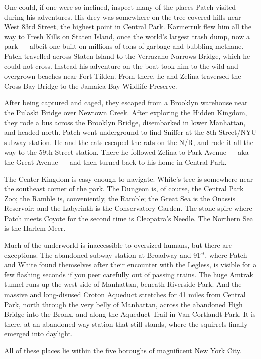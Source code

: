 \documentclass[12pt]{memoir}
\begin{document}
One could, if one were so inclined, inspect many of the places Patch
visited during his adventures. His drey was somewhere on the
tree-covered hills near West 83rd Street, the highest point in Central
Park. Karmerruk flew him all the way to Fresh Kills on Staten Island,
once the world’s largest trash dump, now a park — albeit one built on
millions of tons of garbage and bubbling methane. Patch travelled
across Staten Island to the Verrazano Narrows Bridge, which he could
not cross. Instead his adventure on the boat took him to the wild and
overgrown beaches near Fort Tilden. From there, he and Zelina
traversed the Cross Bay Bridge to the Jamaica Bay Wildlife Preserve.

After being captured and caged, they escaped from a Brooklyn warehouse
near the Pulaski Bridge over Newtown Creek. After exploring the Hidden
Kingdom, they rode a bus across the Brooklyn Bridge, disembarked in
lower Manhattan, and headed north. Patch went underground to find
Sniffer at the 8th Street/NYU subway station. He and the cats escaped
the rats on the N/R, and rode it all the way to the 59th Street
station. There he followed Zelina to Park Avenue — aka the Great
Avenue — and then turned back to his home in Central Park.

The Center Kingdom is easy enough to navigate. White’s tree is
somewhere near the southeast corner of the park. The Dungeon is, of
course, the Central Park Zoo; the Ramble is, conveniently, the Ramble;
the Great Sea is the Onassis Reservoir; and the Labyrinth is the
Conservatory Garden. The stone spire where Patch meets Coyote for the
second time is Cleopatra’s Needle. The Northern Sea is the Harlem
Meer.

Much of the underworld is inaccessible to oversized humans, but there
are exceptions. The abandoned subway station at Broadway and
91$^{st}$, where Patch and White found themselves after their
encounter with the Legless, is visible for a few flashing seconds if
you peer carefully out of passing trains. The huge Amtrak tunnel runs
up the west side of Manhattan, beneath Riverside Park. And the massive
and long-disused Croton Aqueduct stretches for 41 miles from Central
Park, north through the very belly of Manhattan, across the abandoned
High Bridge into the Bronx, and along the Aqueduct Trail in Van
Cortlandt Park. It is there, at an abandoned way station that still
stands, where the squirrels finally emerged into daylight.

All of these places lie within the five boroughs of magnificent New
York City.

\end{document}

